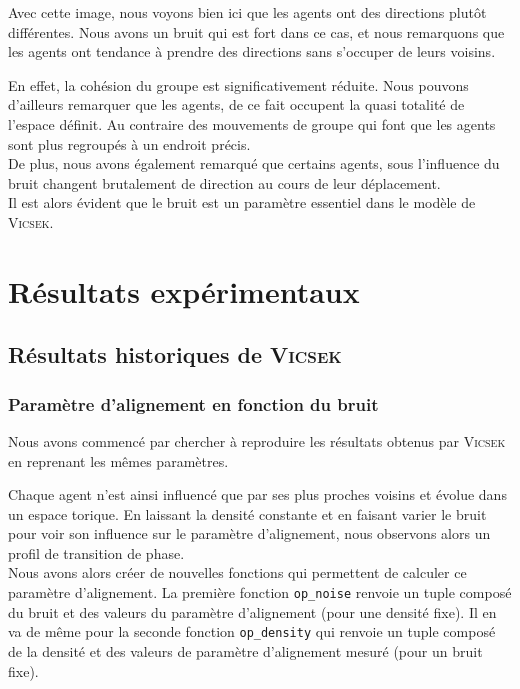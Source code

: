 \documentclass[french, a4paper, 12pt, openany]{report}
\begin{document}
	
Avec cette image, nous voyons bien ici que les agents ont des directions plutôt différentes. Nous avons un bruit qui est fort dans ce cas, et nous remarquons que les agents ont tendance à prendre des directions sans s'occuper de leurs voisins. 

En effet, la cohésion du groupe est significativement réduite. Nous pouvons d'ailleurs remarquer que les agents, de ce fait occupent la quasi totalité de l'espace définit. Au contraire des mouvements de groupe qui font que les agents sont plus regroupés à un endroit précis.  \\

De plus, nous avons également remarqué que certains agents, sous l'influence du bruit changent brutalement de direction au cours de leur déplacement.\\

Il est alors évident que le bruit est un paramètre essentiel dans le modèle de \textsc{Vicsek}.\\



   
\chapter{Résultats expérimentaux} \label{chap:resultats}
\section{Résultats historiques de \textsc{Vicsek}}
\subsection{Paramètre d'alignement en fonction du bruit} 
	Nous avons commencé par chercher à reproduire les résultats obtenus par \textsc{Vicsek} en reprenant les mêmes paramètres.
	
	Chaque agent n'est ainsi influencé que par ses plus proches voisins et évolue dans un espace torique. En laissant la densité constante et en faisant varier le bruit pour voir son influence sur le paramètre d'alignement, nous observons alors un profil de transition de phase.\\
	
	Nous avons alors créer de nouvelles fonctions qui permettent de calculer ce paramètre d'alignement. La première fonction \verb|op_noise| renvoie un tuple composé du bruit et des valeurs du paramètre d'alignement (pour une densité fixe). Il en va de même pour la seconde fonction \verb|op_density| qui renvoie un tuple composé de la densité et des valeurs de paramètre d'alignement mesuré (pour un bruit fixe).
	
\end{document}
